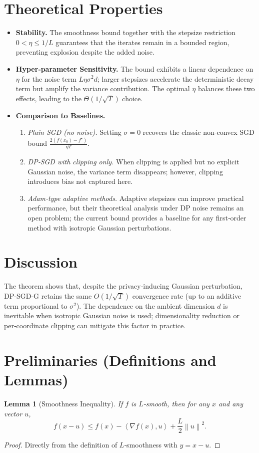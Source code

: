 \documentclass{article}
\newtheorem{lemma}{Lemma}
\newcommand{\norm}[1]{\left\lVert#1\right\rVert}
\newcommand{\inner}[2]{\left\langle #1,#2\right\rangle}
\begin{document}
\section*{Theoretical Properties}
\begin{itemize}
\item \textbf{Stability.} The smoothness bound together with the stepsize restriction $0<\eta\le 1/L$ guarantees that the iterates remain in a bounded region, preventing explosion despite the added noise.
\item \textbf{Hyper‑parameter Sensitivity.} The bound exhibits a linear dependence on $\eta$ for the noise term $L\eta\sigma^{2}d$; larger stepsizes accelerate the deterministic decay term but amplify the variance contribution. The optimal $\eta$ balances these two effects, leading to the $\Theta(1/\sqrt{T})$ choice.
\item \textbf{Comparison to Baselines.}
    \begin{enumerate}
        \item \emph{Plain SGD (no noise).} Setting $\sigma=0$ recovers the classic non‑convex SGD bound $\frac{2(f(x_0)-f^{\star})}{\eta T}$.
        \item \emph{DP‑SGD with clipping only.} When clipping is applied but no explicit Gaussian noise, the variance term disappears; however, clipping introduces bias not captured here.
        \item \emph{Adam‑type adaptive methods.} Adaptive stepsizes can improve practical performance, but their theoretical analysis under DP noise remains an open problem; the current bound provides a baseline for any first‑order method with isotropic Gaussian perturbations.
    \end{enumerate}
\end{itemize}

\section*{Discussion}
The theorem shows that, despite the privacy‑inducing Gaussian perturbation, DP‑SGD‑G retains the same $O(1/\sqrt{T})$ convergence rate (up to an additive term proportional to $\sigma^{2}$). The dependence on the ambient dimension $d$ is inevitable when isotropic Gaussian noise is used; dimensionality reduction or per‑coordinate clipping can mitigate this factor in practice.

\newpage
\section*{Preliminaries (Definitions and Lemmas)}
\begin{lemma}[Smoothness Inequality]\label{lem:smooth}
If $f$ is $L$‑smooth, then for any $x$ and any vector $u$,
\[
f(x-u)\le f(x)-\inner{\nabla f(x)}{u}+\frac{L}{2}\norm{u}^{2}.
\]
\end{lemma}
\begin{proof}
Directly from the definition of $L$‑smoothness with $y=x-u$.
\end{proof}
\end{document}

